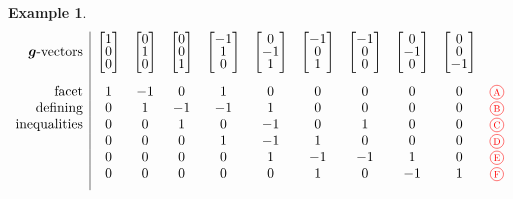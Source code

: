 \documentclass{amsart}
\theoremstyle{definition}
\newtheorem{example}[theorem]{Example}
\renewcommand{\b}[1]{{\boldsymbol{#1}}} %
\newcommand{\red}{\color{red}} %
\newcommand*\circled[1]{\tikz[baseline=(char.base)]{\node[shape=circle, draw, inner sep=1.5pt, scale=.7] (char) {#1};}}
\newcommand{\compactVectorT}[3]{\begin{bmatrix} #1 \\[-.1cm] #2 \\[-.1cm] #3 \end{bmatrix}}
\begin{document}
\begin{example}
\[\begin{array}{r|cccccccccc}
\text{$\b{g}$-vectors} & \compactVectorT{1}{0}{0} & \compactVectorT{0}{1}{0} & \compactVectorT{0}{0}{1} & \compactVectorT{-1}{1}{0} & \compactVectorT{0}{-1}{1} & \compactVectorT{-1}{0}{1} & \compactVectorT{-1}{0}{0} & \compactVectorT{0}{-1}{0} & \compactVectorT{0}{0}{-1} \\[.6cm]
\text{facet}		& 1 & -1 & 0 & 1 & 0 & 0 & 0 & 0 & 0 & \red \circled{A} \\
\text{defining} 	& 0 & 1 & -1 & -1 & 1 & 0 & 0 & 0 & 0 & \red \circled{B} \\
\text{inequalities}	& 0 & 0 & 1 & 0 & -1 & 0 & 1 & 0 & 0 & \red \circled{C} \\
					& 0 & 0 & 0 & 1 & -1 & 1 & 0 & 0 & 0 & \red \circled{D} \\
					& 0 & 0 & 0 & 0 & 1 & -1 & -1 & 1 & 0 & \red \circled{E} \\
					& 0 & 0 & 0 & 0 & 0 & 1 & 0 & -1 & 1 & \red \circled{F} \\[.2cm]
\end{array}
\]
\medskip





\end{example}
\end{document}

